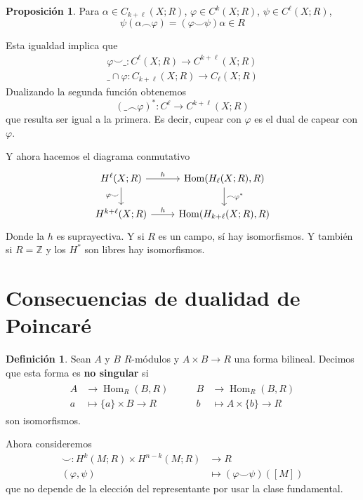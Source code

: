 \documentclass[spanish]{book}
\theoremstyle{definition}
\newtheorem*{defn}{Definición}
\newtheorem*{prop}{Proposición}
\newcommand{\Z}{\mathbb{Z}}
\DeclareMathOperator{\Hom}{Hom}
\begin{document}
\begin{prop}
	Para $\alpha\in C_{k+\ell}(X;R)$, $\varphi\in C^k(X;R)$, $\psi\in C^\ell(X;R)$, 
\[\psi(\alpha\frown\varphi)=(\varphi\smile\psi)\alpha\in R\]
\end{prop}

Esta igualdad implica que
\begin{align*}
	\varphi\smile\_:C^\ell(X;R)\to C^{k+\ell}(X;R)\\
	\_\cap\varphi:C_{k+\ell}(X;R)\to C_\ell(X;R)
\end{align*}
Dualizando la segunda función obtenemos
\[(\_\frown\varphi)^*:C^\ell\to C^{k+\ell}(X;R)\]
que resulta ser igual a la primera. Es decir, cupear con $\varphi$ es el dual de capear con $\varphi$.

Y ahora hacemos el diagrama conmutativo
\[\begin{tikzcd}
	H^\ell(X;R)\arrow[d,"\varphi\smile",swap]\arrow[r,"h"]&\Hom(H_\ell(X;R),R)\arrow[d,"\frown\varphi^*"]\\
	H^{k+\ell}(X;R)\arrow[r,"h"]&\Hom(H_{k+\ell}(X;R),R)
\end{tikzcd}\]
Donde la $h$ es suprayectiva. Y si $R$ es un campo, sí hay isomorfismos. Y también si $R=\Z$ y los $H^*$ son libres hay isomorfismos.

\section{Consecuencias de dualidad de Poincaré}
\begin{defn}
	Sean $A$ y $B$ $R$-módulos y $A\times B\to R$ una forma bilineal. Decimos que esta forma es \textbf{no singular} si 
	\begin{align*}
\begin{aligned}
			A&\to\Hom_R(B,R)\\
		a&\mapsto \{a\}\times B\to R
\end{aligned}\qquad
\begin{aligned}
	B&\to\Hom_R(B,R)\\
	b&\mapsto A\times\{b\}\to R
\end{aligned}
	\end{align*}
	son isomorfismos.
\end{defn}
Ahora consideremos
\begin{align*}
	\smile:H^k(M;R)\times H^{n-k}(M;R)&\to R\\
	(\varphi,\psi)\qquad\qquad\quad&\mapsto(\varphi\smile\psi)([M])
\end{align*}
que no depende de la elección del representante por usar la clase fundamental.
\end{document}
